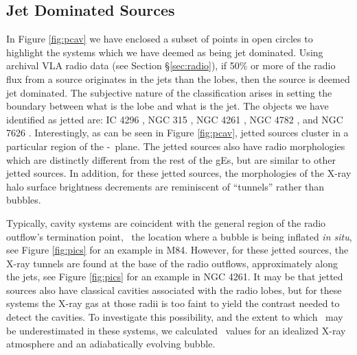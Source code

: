 \documentclass{emulateapj}
\begin{document}
\subsection{Jet Dominated Sources}
\label{sec:jet}


In Figure \ref{fig:pcav} we have enclosed a subset of points in open
circles to highlight the systems which we have deemed as being jet
dominated. Using archival VLA radio data (see Section
\S\ref{sec:radio}), if 50\% or more of the radio flux from a source
originates in the jets than the lobes, then the source is deemed jet
dominated. The subjective nature of the classification arises in
setting the boundary between what is the lobe and what is the jet. The
objects we have identified as jetted are: IC 4296
\citep{2003ApJ...585..677P}, NGC 315 \citep{1979ApJ...228L...9B,
  1981A&A....95..250W}, NGC 4261 \citep{1997ApJ...484..186J,
  2000ApJ...534..165J}, NGC 4782 \citep{2007ApJ...664..804M}, and NGC
7626 \citep{1985ApJ...291...32B}. Interestingly, as can be seen in
Figure \ref{fig:pcav}, jetted sources cluster in a particular region
of the \pjet-\prad\ plane. The jetted sources also have radio
morphologies which are distinctly different from the rest of the gEs,
but are similar to other jetted sources. In addition, for these jetted
sources, the morphologies of the X-ray halo surface brightness
decrements are reminiscent of ``tunnels'' rather than bubbles.

Typically, cavity systems are coincident with the general region of
the radio outflow's termination point, \ie\ the location where a
bubble is being inflated {\it{in situ}}, see Figure \ref{fig:pics} for
an example in M84. However, for these jetted sources, the X-ray
tunnels are found at the base of the radio outflows, approximately
along the jets, see Figure \ref{fig:pics} for an example in NGC
4261. It may be that jetted sources also have classical cavities
associated with the radio lobes, but for these systems the X-ray gas
at those radii is too faint to yield the contrast needed to detect the
cavities. To investigate this possibility, and the extent to which
\pcav\ may be underestimated in these systems, we calculated \pcav\
values for an idealized X-ray atmosphere and an adiabatically evolving
bubble.
\end{document}
